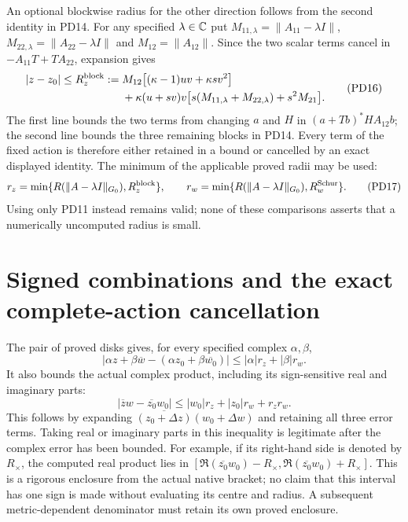 An optional blockwise radius for the other direction follows from
the second identity in PD14.  For any specified $\lambda\in\mathbb C$ put
$M_{11,\lambda}=\|A_{11}-\lambda I\|$,
$M_{22,\lambda}=\|A_{22}-\lambda I\|$ and
$M_{12}=\|A_{12}\|$.  Since the two scalar terms cancel in
$-A_{11}T+TA_{22}$, expansion gives
\[
 \begin{split}
 |z-z_0|\le R_z^{\rm block}:={}&
 M_{12}\bigl[(\kappa-1)uv+\kappa s v^2\bigr]\\
 &+\kappa(u+sv)v
       \bigl[s(M_{11,\lambda}+M_{22,\lambda})+s^2M_{21}\bigr].
 \end{split}                                                      \tag{PD16}
\]
The first line bounds the two terms from changing $a$ and $H$
in $(a+Tb)^*HA_{12}b$; the second line bounds the three remaining
blocks in PD14.  Every term of the fixed action is therefore
either retained in a bound or cancelled by an exact displayed
identity.  The minimum of the applicable proved radii may be used:
\[
 r_z=\min\{R(\|A-\lambda I\|_{G_0}),R_z^{\rm block}\},\qquad
 r_w=\min\{R(\|A-\lambda I\|_{G_0}),R_w^{\rm Schur}\}.          \tag{PD17}
\]
Using only PD11 instead remains valid; none of these comparisons
asserts that a numerically uncomputed radius is small.

\section{Signed combinations and the exact complete-action cancellation}
The pair of proved disks gives, for every specified complex
$\alpha,\beta$,
\[
 \left|\alpha z+\beta\overline w
         -(\alpha z_0+\beta\overline{w_0})\right|
                        \le|\alpha|r_z+|\beta|r_w.              \tag{PD18}
\]
It also bounds the actual complex product, including its sign-sensitive
real and imaginary parts:
\[
 \boxed{|\overline z w-\overline{z_0}w_0|
       \le |w_0|r_z+|z_0|r_w+r_zr_w.}                           \tag{PD19}
\]
This follows by expanding
$\overline{(z_0+\Delta z)}(w_0+\Delta w)$ and retaining all three
error terms.  Taking real or imaginary parts in this inequality
is legitimate after the complex error has been bounded.  For
example, if its right-hand side is denoted by $R_\times$, the
computed real product lies in
$[\Re(\overline{z_0}w_0)-R_\times,
\Re(\overline{z_0}w_0)+R_\times]$.
This is a rigorous enclosure from the actual native bracket; no
claim that this interval has one sign is made without evaluating
its centre and radius.  A subsequent metric-dependent denominator
must retain its own proved enclosure.

